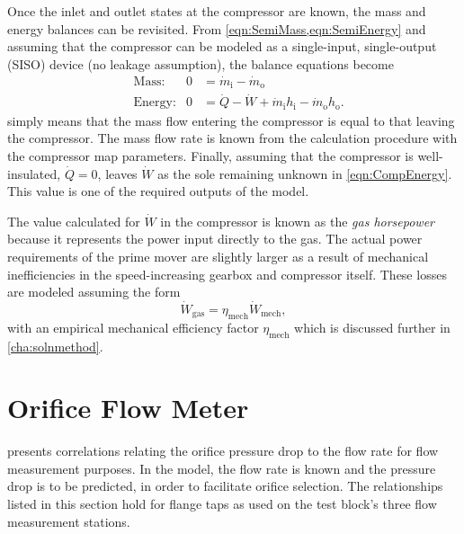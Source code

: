 Once the inlet and outlet states at the compressor are known, 
the mass and energy balances can be revisited. 
From \cref{eqn:SemiMass,eqn:SemiEnergy} and
assuming that the compressor can be modeled as a 
single-input, single-output (SISO) device (no leakage assumption), 
the balance equations become
\begin{align}
  &\text{Mass:}   & 0 &= {\dot{m}_{\text{i}}} - {\dot{m}_{\text{o}}} \label{eqn:CompMass}\\
  &\text{Energy:} & 0 &= \dot{Q} - \dot{W} + {\dot{m}_{\text{i}}h_{\text{i}}} - 
		{\dot{m}_{\text{o}}h_{\text{o}}} \label{eqn:CompEnergy}.
\end{align}
 simply means that the mass flow 
entering the compressor is equal to that leaving the compressor. 
The mass flow rate is known from the 
calculation procedure with the compressor map parameters. 
Finally, assuming that the compressor is well-insulated, 
$\dot{Q}=0$, leaves $\dot{W}$ 
as the sole remaining unknown in \cref{eqn:CompEnergy}. 
This value is one of the required outputs of the model. 

The value calculated for $\dot{W}$ in the compressor is known
as the \emph{gas horsepower} because it represents the power input
directly to the gas. The actual power requirements of the
prime mover are slightly larger as a result of mechanical inefficiencies
in the speed-increasing gearbox and compressor itself.
These losses are modeled assuming the form
\begin{equation}
  \dot{W}_{\text{gas}} = \eta_{\text{mech}}\dot{W}_{\text{mech}},
\end{equation}
with an empirical mechanical efficiency factor $\eta_{\text{mech}}$
which is discussed further in \cref{cha:solnmethod}.

\section{Orifice Flow Meter} \label{sec:Orifice}
\textcite{ptc19} presents correlations relating the orifice pressure drop to the
flow rate for flow measurement purposes.
In the model, the flow rate is known and the pressure drop is to be predicted,
in order to facilitate orifice selection.
The relationships listed in this section hold for flange taps as used
on the  test block's three flow measurement stations.

